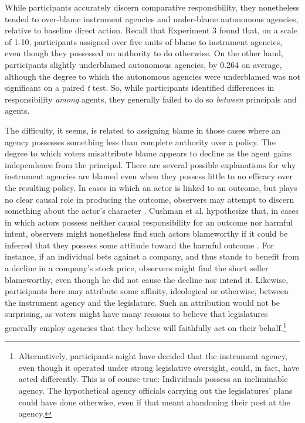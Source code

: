 \documentclass{article}
\begin{document}
While participants accurately discern comparative responsibility, they nonetheless tended to over-blame instrument agencies and under-blame autonomous agencies, relative to baseline direct action. Recall that Experiment 3 found that, on a scale of 1-10, participants assigned over five units of blame to instrument agencies, even though they possessed no authority to do otherwise. On the other hand, participants slightly underblamed autonomous agencies, by 0.264 on average, although the degree to which the autonomous agencies were underblamed was not significant on a paired \emph{t} test. So, while participants identified differences in responsibility \emph{among} agents, they generally failed to do so \emph{between} principals and agents. 

The difficulty, it seems, is related to assigning blame in those cases where an agency possesses something less than complete authority over a policy. The degree to which voters misattribute blame appears to decline as the agent gains independence from the principal. There are several possible explanations for why instrument agencies are blamed even when they possess little to no efficacy over the resulting policy. In cases in which an actor is linked to an outcome, but plays no clear causal role in producing the outcome, observers may attempt to discern something about the actor's character \citep{Nadler2012}. Cushman et al. hypothesize that, in cases in which actors possess neither causal responsibility for an outcome nor harmful intent, observers might nonetheless find such actors blameworthy if it could be inferred that they possess some attitude toward the harmful outcome \citep{Cushman2012}. For instance, if an individual bets against a company, and thus stands to benefit from a decline in a company's stock price, observers might find the short seller blameworthy, even though he did not cause the decline nor intend it. Likewise, participants here may attribute some affinity, ideological or otherwise, between the instrument agency and the legislature. Such an attribution would not be surprising, as voters might have many reasons to believe that legislatures generally employ agencies that they believe will faithfully act on their behalf.\footnote{Alternatively, participants might have decided that the instrument agency, even though it operated under strong legislative oversight, could, in fact, have acted differently. This is of course true: Individuals possess an ineliminable agency. The hypothetical agency officials carrying out the legislatures' plans could have done otherwise, even if that meant abandoning their post at the agency.} 
\end{document}

